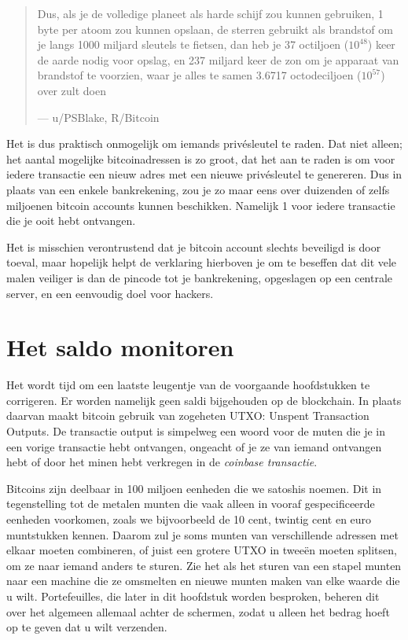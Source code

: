 \documentclass[smalldemyvopaper,11pt,twoside,onecolumn,openright,extrafontsizes]{memoir}
\begin{document}
\begin{quotation}
Dus, als je de volledige planeet als harde schijf zou kunnen gebruiken, 1 byte per atoom zou kunnen opslaan, de sterren gebruikt als brandstof om je langs 1000 miljard sleutels te fietsen, dan heb je 37 octiljoen ($10^{48}$) keer de aarde nodig voor opslag, en 237 miljard keer de zon om je apparaat van brandstof te voorzien, waar je alles te samen 3.6717 octodeciljoen  ($10^{57}$)  over zult doen\par\raggedleft--- \textup{u/PSBlake, R/Bitcoin}
\end{quotation}

Het is dus praktisch onmogelijk om iemands privésleutel te raden. Dat niet alleen; het aantal mogelijke bitcoinadressen is zo groot, dat het aan te raden is om voor iedere transactie een nieuw adres met een nieuwe privésleutel te genereren. Dus in plaats van een enkele bankrekening, zou je zo maar eens over duizenden of zelfs miljoenen bitcoin accounts kunnen beschikken. Namelijk 1 voor iedere transactie die je ooit hebt ontvangen.

Het is misschien verontrustend dat je bitcoin account slechts beveiligd is door toeval, maar hopelijk helpt de verklaring hierboven je om te beseffen dat dit vele malen veiliger is dan de pincode tot je bankrekening, opgeslagen op een centrale server, en een eenvoudig doel voor hackers.

\section{Het saldo monitoren}

Het wordt tijd om een laatste leugentje van de voorgaande hoofdstukken te corrigeren. Er worden namelijk geen saldi bijgehouden op de blockchain. In plaats daarvan maakt bitcoin gebruik van zogeheten UTXO: Unspent Transaction Outputs. De transactie output is simpelweg een woord voor de muten die je in een vorige transactie hebt ontvangen, ongeacht of je ze van iemand ontvangen hebt of door het minen hebt verkregen in de \textit{coinbase transactie}.

Bitcoins zijn deelbaar in 100 miljoen eenheden die we satoshis noemen. Dit in tegenstelling tot de metalen munten die vaak alleen in vooraf gespecificeerde eenheden voorkomen, zoals we bijvoorbeeld de 10 cent, twintig cent en euro muntstukken kennen. Daarom zul je soms munten van verschillende adressen met elkaar moeten combineren, of juist een grotere UTXO in tweeën moeten splitsen, om ze naar iemand anders te sturen. Zie het als het sturen van een stapel munten naar een machine die ze omsmelten en nieuwe munten maken van elke waarde die u wilt. Portefeuilles, die later in dit hoofdstuk worden besproken, beheren dit over het algemeen allemaal achter de schermen, zodat u alleen het bedrag hoeft op te geven dat u wilt verzenden.
\end{document}
